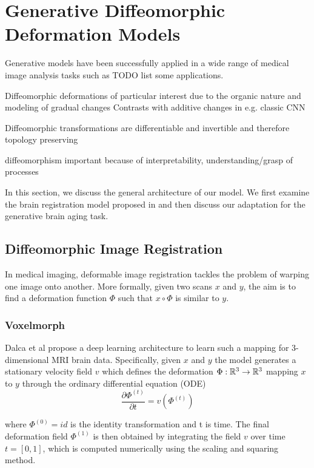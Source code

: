 \chapter{Generative Diffeomorphic Deformation Models}
Generative models have been successfully applied in a wide range of medical image analysis tasks such as TODO list some applications. 

Diffeomorphic deformations of particular interest due to the organic nature and modeling of gradual changes
Contrasts with additive changes in e.g. classic CNN

Diffeomorphic transformations are differentiable and invertible and therefore topology preserving

diffeomorphism important because of interpretability, understanding/grasp of processes


In this section, we discuss the general architecture of our model. We first examine the brain registration model proposed in \cite{balakrishnan2019voxelmorph} \cite{dalca2018unsupervised} and then discuss our adaptation for the generative brain aging task.

\section{Diffeomorphic Image Registration}
\label{chap:voxelmorph}
In medical imaging, deformable image registration tackles the problem of warping one image onto another. More formally, given two scans $x$ and $y$, the aim is to find a deformation function $\Phi$ such that $x \circ \Phi$ is similar to $y$.

\subsection{Voxelmorph} \label{sec:vox}
Dalca et al propose a deep learning architecture to learn such a mapping for 3-dimensional MRI brain data. Specifically, given $x$ and $y$ the model generates a stationary velocity field $v$ which defines the deformation ${\Phi : \mathbb{R}^3 \rightarrow \mathbb{R}^3}$ mapping $x$ to $y$ through the ordinary differential equation (ODE)
\begin{equation} \label{eq:voxODE}
	\frac{\partial \Phi^{(t)}}{\partial t} = v(\Phi^{(t)})
\end{equation}

where $\Phi^{(0)} = id$ is the identity transformation and t is time.
The final deformation field $\Phi^{(1)}$ is then obtained by integrating the field $v$ over time $t = [0, 1]$, which is computed numerically using the scaling and squaring method.

